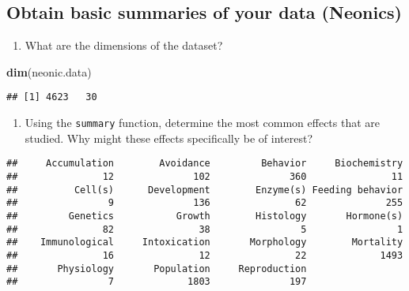 \documentclass[
]{article}
\newenvironment{Shaded}{\begin{snugshade}}{\end{snugshade}}
\newcommand{\KeywordTok}[1]{\textcolor[rgb]{0.13,0.29,0.53}{\textbf{#1}}}
\newcommand{\NormalTok}[1]{#1}
\newcommand{\OperatorTok}[1]{\textcolor[rgb]{0.81,0.36,0.00}{\textbf{#1}}}
\providecommand{\tightlist}{%
  \setlength{\itemsep}{0pt}\setlength{\parskip}{0pt}}
\begin{document}
\hypertarget{obtain-basic-summaries-of-your-data-neonics}{%
\subsection{Obtain basic summaries of your data
(Neonics)}\label{obtain-basic-summaries-of-your-data-neonics}}

\begin{enumerate}
\def\labelenumi{\arabic{enumi}.}
\setcounter{enumi}{4}
\tightlist
\item
  What are the dimensions of the dataset?
\end{enumerate}

\begin{Shaded}
\begin{Highlighting}[]
\KeywordTok{dim}\NormalTok{(neonic.data)}
\end{Highlighting}
\end{Shaded}

\begin{verbatim}
## [1] 4623   30
\end{verbatim}

\begin{enumerate}
\def\labelenumi{\arabic{enumi}.}
\setcounter{enumi}{5}
\tightlist
\item
  Using the \texttt{summary} function, determine the most common effects
  that are studied. Why might these effects specifically be of interest?
\end{enumerate}

\begin{Shaded}
\end{Shaded}

\begin{verbatim}
##     Accumulation        Avoidance         Behavior     Biochemistry 
##               12              102              360               11 
##          Cell(s)      Development        Enzyme(s) Feeding behavior 
##                9              136               62              255 
##         Genetics           Growth        Histology       Hormone(s) 
##               82               38                5                1 
##    Immunological     Intoxication       Morphology        Mortality 
##               16               12               22             1493 
##       Physiology       Population     Reproduction 
##                7             1803              197
\end{verbatim}
\end{document}
